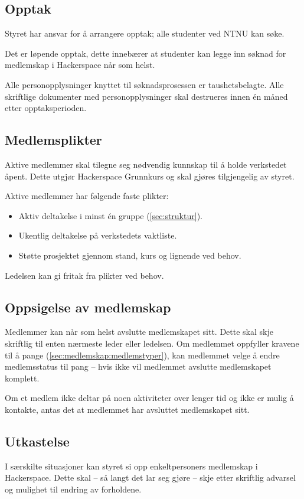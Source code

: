 \subsection{Opptak}\label{sec:medlemskap:opptak}
Styret har ansvar for å arrangere opptak; alle studenter ved NTNU kan søke.

Det er løpende opptak, dette innebærer at studenter kan legge inn
søknad for medlemskap i Hackerspace når som helst.

Alle personopplysninger knyttet til søknadsprosessen er taushetsbelagte. Alle skriftlige dokumenter med personopplysninger skal destrueres innen én måned etter opptaksperioden.

\subsection{Medlemsplikter}\label{sec:medlemskap:medlemsplikter}
Aktive medlemmer skal tilegne seg nødvendig kunnskap til å holde verkstedet åpent.
Dette utgjør Hackerspace Grunnkurs og skal gjøres tilgjengelig av styret.

Aktive medlemmer har følgende faste plikter:
\begin{itemize}
\item Aktiv deltakelse i minst én gruppe (\ref{sec:struktur}).
\item Ukentlig deltakelse på verkstedets vaktliste.
\item Støtte prosjektet gjennom stand, kurs og lignende ved behov.
\end{itemize}
Ledelsen kan gi fritak fra plikter ved behov.

\subsection{Oppsigelse av medlemskap}\label{sec:medlemskap:oppsigelse}
Medlemmer kan når som helst avslutte medlemskapet sitt.
Dette skal skje skriftlig til enten nærmeste leder eller ledelsen.
Om medlemmet oppfyller kravene til å pange (\ref{sec:medlemskap:medlemstyper}), kan medlemmet velge å endre medlemsstatus til pang -- hvis ikke vil medlemmet avslutte medlemskapet komplett.

Om et medlem ikke deltar på noen aktiviteter over lenger tid og ikke er mulig å kontakte, antas det at medlemmet har avsluttet medlemskapet sitt.

\subsection{Utkastelse}\label{sec:medlemskap:utkastelse}
I særskilte situasjoner kan styret si opp enkeltpersoners medlemskap i Hackerspace.
Dette skal -- så langt det lar seg gjøre -- skje etter skriftlig advarsel og mulighet til endring av forholdene.

